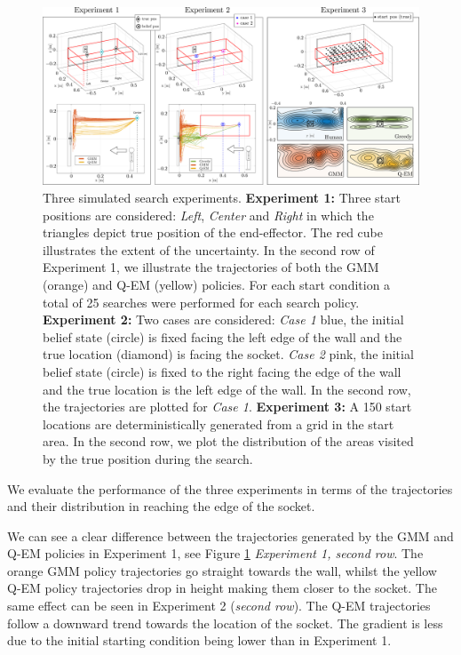 \begin{figure}
    \centering
    \includegraphics[width=\textwidth]{./ch4-PiH/Figures/Fig/Experiment_final_v2.pdf}
    \caption{Three simulated search experiments. \textbf{Experiment 1:} Three start positions are considered: \textit{Left}, \textit{Center} and
     \textit{Right} in which the triangles depict true position of the end-effector. The red cube illustrates the extent of the uncertainty. 
     In the second row of Experiment 1, we illustrate the trajectories of both the GMM (orange) and Q-EM (yellow) policies. For each start condition 
     a total of 25 searches were performed for each search policy. 
     \textbf{Experiment 2:} Two cases are considered: \textit{Case 1} blue, the initial belief state (circle) is fixed facing 
     the left edge of the wall and the true location (diamond) is facing the socket.
     \textit{Case 2} pink, the initial belief state (circle) is fixed to the right facing the edge of the wall and the 
     true location is the left edge of the wall. In the second row, the trajectories are plotted for \textit{Case 1}.
     \textbf{Experiment 3:} A 150 start locations are deterministically generated from a 
     grid in the start area. In the second row, we plot the distribution of the areas visited by the true position during the search.}
    \label{fig:box_exp_sim}
\end{figure}

We evaluate the performance of the three experiments in terms of the trajectories and their distribution in reaching 
the edge of the socket. 

We can see a clear difference between the trajectories generated by the GMM and Q-EM policies in Experiment 1, 
see Figure \ref{fig:box_exp_sim} \textit{Experiment 1, second row}. The orange GMM policy trajectories 
go straight towards the wall, whilst the yellow Q-EM policy trajectories drop in height making them closer 
to the socket. The same effect can be seen in Experiment 2 (\textit{second row}). The Q-EM trajectories 
follow a downward trend towards the location of the socket. The gradient is less due to the initial starting condition being lower than in Experiment 1. 

